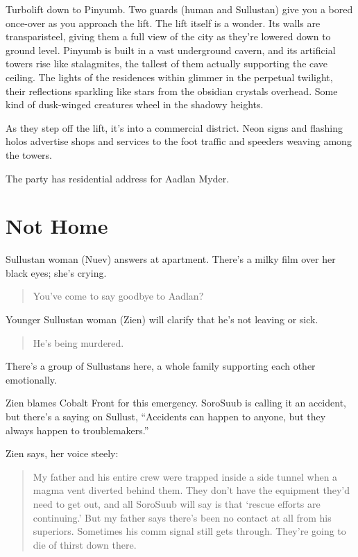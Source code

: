 \documentclass[background]{book}
\begin{document}
\begin{multicols}{2}
Turbolift down to Pinyumb. Two guards (human and Sullustan) give you a bored once-over as you approach the lift. The lift itself is a wonder. Its walls are transparisteel, giving them a full view of the city as they’re lowered down to ground level. Pinyumb is built in a vast underground cavern, and its artificial towers rise like stalagmites, the tallest of them actually supporting the cave ceiling. The lights of the residences within glimmer in the perpetual twilight, their reflections sparkling like stars from the obsidian crystals overhead. Some kind of dusk-winged creatures wheel in the shadowy heights.

As they step off the lift, it’s into a commercial district. Neon signs and flashing holos advertise shops and services to the foot traffic and speeders weaving among the towers.

The party has residential address for Aadlan Myder.

\section{Not Home}

Sullustan woman (Nuev) answers at apartment. There’s a milky film over her black eyes; she’s crying.
\begin{quote}
You’ve come to say goodbye to Aadlan? 
\end{quote}

Younger Sullustan woman (Zien) will clarify that he’s not leaving or sick.
\begin{quote}
He’s being murdered.
\end{quote}

There’s a group of Sullustans here, a whole family supporting each other emotionally.

Zien blames Cobalt Front for this emergency. SoroSuub is calling it an accident, but there’s a saying on Sullust, “Accidents can happen to anyone, but they always happen to troublemakers.”

Zien says, her voice steely:
\begin{quote}
My father and his entire crew were trapped inside a side tunnel when a magma vent diverted behind them. They don’t have the equipment they’d need to get out, and all SoroSuub will say is that ‘rescue efforts are continuing.’ But my father says there’s been no contact at all from his superiors. Sometimes his comm signal still gets through. They’re going to die of thirst down there.
\end{quote}



\end{multicols}
\end{document}
